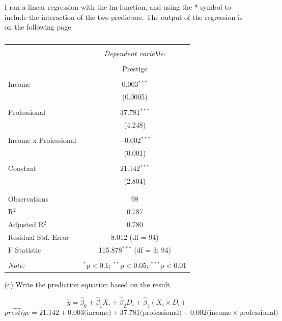 \documentclass[12pt,letterpaper]{article}
\begin{document}
\begin{enumerate}
	\noindent I ran a linear regression with the lm function, and using the * symbol to include the interaction of the two predictors. The output of the regression is on the following page. \\
	
	\begin{table}[!htbp] \centering 
		\caption{} 
		\label{} 
		\begin{tabular}{@{\extracolsep{5pt}}lc} 
			\\[-1.8ex]\hline 
			\hline \\[-1.8ex] 
			& \multicolumn{1}{c}{\textit{Dependent variable:}} \\ 
			\cline{2-2} 
			\\[-1.8ex] & Prestige \\ 
			\hline \\[-1.8ex] 
			Income & 0.003$^{***}$ \\ 
			& (0.0005) \\ 
			& \\ 
			Professional & 37.781$^{***}$ \\ 
			& (4.248) \\ 
			& \\ 
			Income x Professional & $-$0.002$^{***}$ \\ 
			& (0.001) \\ 
			& \\ 
			Constant & 21.142$^{***}$ \\ 
			& (2.804) \\ 
			& \\ 
			\hline \\[-1.8ex] 
			Observations & 98 \\ 
			R$^{2}$ & 0.787 \\ 
			Adjusted R$^{2}$ & 0.780 \\ 
			Residual Std. Error & 8.012 (df = 94) \\ 
			F Statistic & 115.878$^{***}$ (df = 3; 94) \\ 
			\hline 
			\hline \\[-1.8ex] 
			\textit{Note:}  & \multicolumn{1}{r}{$^{*}$p$<$0.1; $^{**}$p$<$0.05; $^{***}$p$<$0.01} \\ 
		\end{tabular} 
	\end{table} 
	\item [(c)]
	Write the prediction equation based on the result.
	
		\begin{equation}
		\hat{y} = \hat{\beta}_0 + \hat{\beta}_1 X_i + \hat{\beta}_2 D_i + \hat{\beta}_3(X_i\times D_i)
	\end{equation}
	\begin{equation}
		\widehat{prestige} = 21.142  + 0.003\text{(income)} + 37.781\text{(professional)} - 0.002\text{(income}\times\text{professional)}
	\end{equation}
	

\end{enumerate}
\end{document}
